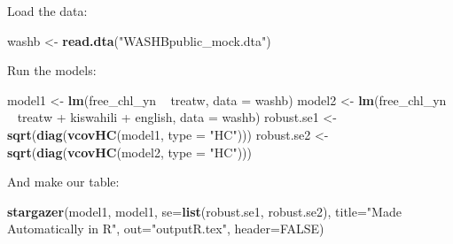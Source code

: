 \documentclass[11pt,]{article}
\newenvironment{Shaded}{\begin{snugshade}}{\end{snugshade}}
\newcommand{\KeywordTok}[1]{\textcolor[rgb]{0.13,0.29,0.53}{\textbf{{#1}}}}
\newcommand{\DataTypeTok}[1]{\textcolor[rgb]{0.13,0.29,0.53}{{#1}}}
\newcommand{\StringTok}[1]{\textcolor[rgb]{0.31,0.60,0.02}{{#1}}}
\newcommand{\OtherTok}[1]{\textcolor[rgb]{0.56,0.35,0.01}{{#1}}}
\newcommand{\NormalTok}[1]{{#1}}
\begin{document}
Load the data:

\begin{Shaded}
\begin{Highlighting}[]
\NormalTok{washb <-}\StringTok{ }\KeywordTok{read.dta}\NormalTok{(}\StringTok{"WASHBpublic_mock.dta"}\NormalTok{)}
\end{Highlighting}
\end{Shaded}

Run the models:

\begin{Shaded}
\begin{Highlighting}[]
\NormalTok{model1 <-}\StringTok{ }\KeywordTok{lm}\NormalTok{(free_chl_yn ~}\StringTok{ }\NormalTok{treatw, }\DataTypeTok{data =} \NormalTok{washb) }
\NormalTok{model2 <-}\StringTok{ }\KeywordTok{lm}\NormalTok{(free_chl_yn ~}\StringTok{ }\NormalTok{treatw +}\StringTok{ }\NormalTok{kiswahili +}\StringTok{ }\NormalTok{english, }\DataTypeTok{data =} \NormalTok{washb)}
\NormalTok{robust.se1 <-}\StringTok{ }\KeywordTok{sqrt}\NormalTok{(}\KeywordTok{diag}\NormalTok{(}\KeywordTok{vcovHC}\NormalTok{(model1, }\DataTypeTok{type =} \StringTok{"HC"}\NormalTok{)))}
\NormalTok{robust.se2 <-}\StringTok{ }\KeywordTok{sqrt}\NormalTok{(}\KeywordTok{diag}\NormalTok{(}\KeywordTok{vcovHC}\NormalTok{(model2, }\DataTypeTok{type =} \StringTok{"HC"}\NormalTok{)))}
\end{Highlighting}
\end{Shaded}

And make our table:

\begin{Shaded}
\begin{Highlighting}[]
\KeywordTok{stargazer}\NormalTok{(model1, model1, }\DataTypeTok{se=}\KeywordTok{list}\NormalTok{(robust.se1, robust.se2), }
          \DataTypeTok{title=}\StringTok{"Made Automatically in R"}\NormalTok{, }
          \DataTypeTok{out=}\StringTok{"outputR.tex"}\NormalTok{, }\DataTypeTok{header=}\OtherTok{FALSE}\NormalTok{)}
\end{Highlighting}
\end{Shaded}
\end{document}
